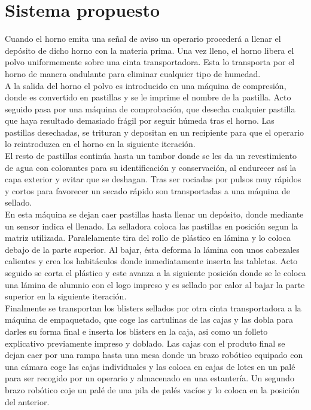 \section{Sistema propuesto}


Cuando el horno emita una señal de aviso un operario procederá a llenar el depósito de dicho horno con la materia prima. Una vez lleno, el horno libera el polvo uniformemente sobre una cinta transportadora. Esta lo transporta por el horno de manera ondulante para eliminar cualquier tipo de humedad. 
\\

A la salida del horno el polvo es introducido en una máquina de compresión, donde es convertido en pastillas y se le imprime el nombre de la pastilla.  Acto seguido pasa por una máquina de comprobación, que desecha cualquier pastilla que haya resultado demasiado frágil por seguir húmeda tras el horno. Las pastillas desechadas, se trituran y depositan en un recipiente para que el operario lo reintroduzca en el horno en la siguiente iteración. 
\\

El resto de pastillas continúa hasta un tambor donde se les da un revestimiento de agua con colorantes para su identificación y conservación, al endurecer así la capa exterior y evitar que se deshagan. Tras ser rociadas por pulsos muy rápidos y cortos para favorecer un secado rápido son transportadas a una máquina de sellado.
\\

En esta máquina se dejan caer pastillas hasta llenar un depósito, donde mediante un sensor indica el llenado. La selladora coloca las pastillas en posición segun la matriz utilizada. Paralelamente tira del rollo de plástico en lámina y lo coloca debajo de la parte superior. Al bajar, ésta deforma la lámina con unos cabezales calientes y crea los habitáculos donde inmediatamente inserta las tabletas. Acto seguido se corta el plástico y este avanza a la siguiente posición donde se le coloca una lámina de alumnio con el logo impreso y es sellado por calor al bajar la parte superior en la siguiente iteración. 
\\

Finalmente se transportan los blisters sellados por otra cinta transportadora a la máquina de empaquetado, que coge las cartulinas de las cajas y las dobla para darles su forma final e inserta los blisters en la caja, asi como un folleto explicativo previamente impreso y doblado. Las cajas con el produto final se dejan caer por una rampa hasta una mesa donde un brazo robótico equipado con una cámara coge las cajas individuales y las coloca en cajas de lotes en un palé para ser recogido por un operario y almacenado en una estantería. Un segundo brazo robótico coje un palé de una pila de palés vacíos y lo coloca en la posición del anterior.
\\

